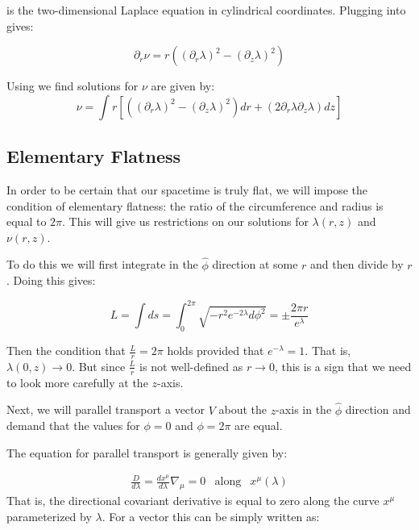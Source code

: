 \documentclass{article}
\begin{document}
 is the two-dimensional Laplace equation in cylindrical coordinates. Plugging  into  gives:

\begin{equation}
\partial_{r}\nu=r\left(\left(\partial_{r}\lambda\right)^{2}-\left(\partial_{z}\lambda\right)^{2}\right)\label{eq:nu_r}
\end{equation}

Using  we find solutions for $\nu$ are given by:
\begin{equation}
\nu=\int r[\left(\left(\partial_{r}\lambda\right)^{2}-\left(\partial_{z}\lambda\right)^{2}\right)dr+\left(2\partial_{r}\lambda\partial_{z}\lambda\right)dz]\label{eq:nu}
\end{equation}

\subsection{Elementary Flatness}

In order to be certain that our spacetime is truly flat, we will
impose the condition of elementary flatness: the ratio of the
circumference and radius is equal to $2\pi$. This will give us restrictions on our solutions for $\lambda\left(r,z\right)$ and $\nu\left(r,z\right)$.

To do this we will first integrate in the $\hat{\phi}$ direction at
some $r$ and then divide by $r$. Doing this gives:

\begin{equation}
  \label{eq:phi-hat-length}
  L=\int ds =
  \int_0^{2\pi}\sqrt{-r^2e^{-2\lambda}d\phi^2}=\pm\frac{2\pi r}{e^{\lambda}}
\end{equation}

Then the condition that $\frac{L}{r}=2\pi$ holds provided that
$e^{-\lambda}=1$. That is, $\lambda(0,z)\rightarrow 0$. But since
$\frac{L}{r}$ is not well-defined as $r\rightarrow 0$, this is a sign
that we need to look more carefully at the $z$-axis.

Next, we will parallel transport a vector $V$ about the $z$-axis in
the $\hat{\phi}$ direction and demand that the values
for $\phi=0$ and $\phi=2\pi$ are equal. 

The equation for parallel transport is generally given by:
  	
\begin{equation}
\begin{array}{rcl} \frac{D}{d\lambda}=\frac{dx^{\mu}}{d\lambda}\nabla_{\mu}=0 & \mbox{along} & x^{\mu}\left(\lambda\right)	  	
\end{array}
\end{equation}	  	
That is, the directional covariant derivative is equal to zero along
the curve $x^{\mu}$ parameterized by $\lambda$. For a vector this can
be simply written as:
\end{document}
